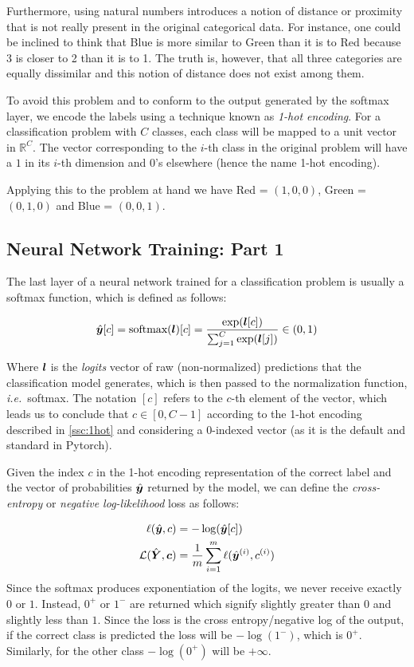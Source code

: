 Furthermore, using natural numbers introduces a notion of distance or proximity that is not really present in the original categorical data.
For instance, one could be inclined to think that Blue is more similar to Green than it is to Red because 3 is closer to 2 than it is to 1.
The truth is, however, that all three categories are equally dissimilar and this notion of distance does not exist among them.

To avoid this problem and to conform to the output generated by the softmax layer, we encode the labels using a technique known as \emph{1-hot encoding}.
For a classification problem with $C$ classes, each class will be mapped to a unit vector in $\mathbb{R}^C$. The vector corresponding to the $i$-th class in the original problem will have a $1$ in its $i$-th dimension and $0$'s elsewhere (hence the name 1-hot encoding).

Applying this to the problem at hand we have Red = $(1,0,0)$, Green = $(0,1,0)$ and Blue = $(0,0,1)$.

\subsection{Neural Network Training: Part 1}
The last layer of a neural network trained for a classification problem is usually a softmax function, which is defined as follows:

\begin{equation*}
    \hat{\vect{y}}[c] = \text{softmax}(\vect{l})[c] = \frac{\exp(\vect{l}[c])}{\sum_{j=1}^C \exp(\vect{l}[j])} \in (0,1)
\end{equation*}

Where $\vect{l}$ is the \emph{logits} vector of raw (non-normalized) predictions that the classification model generates, which is then passed to the normalization function, \emph{i.e.}\ softmax.
The notation $[c]$ refers to the $c$-th element of the vector, which leads us to conclude that $c \in [0,C-1]$ according to the 1-hot encoding described in \cref{ssc:1hot} and considering a 0-indexed vector (as it is the default and standard in Pytorch).

Given the index $c$ in the 1-hot encoding representation of the correct label and the vector of probabilities $\hat{\vect{y}}$ returned by the model, we can define the \emph{cross-entropy} or \emph{negative log-likelihood} loss as follows:

\begin{align*}
    \ell(\hat{\vect{y}},c) &= -\log(\hat{\vect{y}}[c]) \\
    \mathcal{L}(\hat{\vect{Y}},\vect{c}) &= \frac{1}{m}\sum_{i=1}^m \ell(\hat{\vect{y}}^{(i)},c^{(i)})
\end{align*}
Since the softmax produces exponentiation of the logits, we never receive exactly $0$ or $1$. Instead, $0^+$ or $1^-$ are returned which signify slightly greater than $0$ and slightly less than $1$.
Since the loss is the cross entropy/negative log of the output, if the correct class is predicted the loss will be $-\log(1^-)$, which is $0^+$. Similarly, for the other class $-\log(0^+)$ will be $+\infty$.

